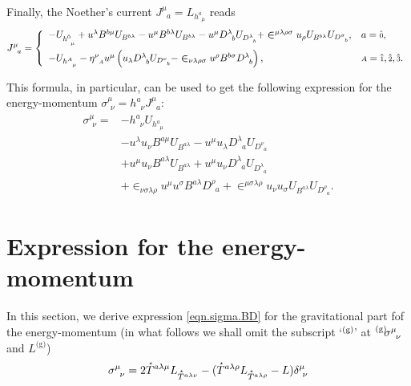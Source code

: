 \documentclass[
10pt, %
a4paper, %
oneside, %
headinclude,footinclude, %
BCOR5mm, %
]{scrartcl}
\newcommand{\sA}{\mathsmaller A}
\newcommand{\tetrsymbol}{h}
\newcommand{\itetrsymbol}{\eta}
\newcommand{\itetr}[2]{\itetrsymbol^{#1}_{\phantom{#1}#2}}
\newcommand{\tetr}[2]{\tetrsymbol^{#1}_{\phantom{#1}#2}}
\newcommand{\Dm}[2]{D_{\phantom{#2}#1}^{#2}}	%
\newcommand{\Bm}[2]{B^{#1#2}}	%
\newcommand{\Laghodge}{L}%
\newcommand{\Um}{U}%
\newcommand{\EMmat}[2]{\sigma^{#1}_{\ \,#2}}
\newcommand{\LCsymb}{\bm{\in}}    %
\newcommand{\gra}[1]{\prescript{\text{(g)}}{}{\hspace{-0.1cm}#1}}
\newcommand{\HDT}[1]{\accentset{\star}{T}^{#1}}
\newcommand{\KD}[2]{\delta^{#1}_{\ #2}}
\newcommand{\NC}[2]{J^{#2}_{\phantom{#2}#1}}
\newcommand{\indalg}[1]{\hat{\mathsmaller{#1}}}
\begin{document}
Finally, the Noether's current $ \NC{a}{\mu} = \Laghodge_{\tetr{a}{\mu}} $ reads
\begin{equation}
	\NC{a}{\mu} = \left\{
	\begin{array}{ll}
	-\Um_{\tetr{\indalg{0}}{\mu}}
	+ u^\lambda \Bm{b}{\mu} \Um_{\Bm{b}{\lambda}} 
	- u^\mu \Bm{b}{\lambda} \Um_{\Bm{b}{\lambda}} 
	- u^\mu \Dm{b}{\lambda} \Um_{\Dm{b}{\lambda}}
	+ \LCsymb^{\mu\lambda\rho\sigma} u_\rho \Um_{\Bm{b}{\lambda}}
	\Um_{\Dm{b}{\sigma}},	& a=\indalg{0},  \\[3mm] 
	-\Um_{\tetr{\sA}{\mu}}	
	- \itetr{\nu}{\sA}u^\mu
	\left(
	u_\lambda \Dm{b}{\lambda} \Um_{\Dm{b}{\nu}} 
	- \LCsymb_{\nu\lambda\rho\sigma}u^\rho\Bm{b}{\sigma}\Dm{b}{\lambda}
	\right), & \sA=\indalg{1},\indalg{2},\indalg{3}. \\ 
	\end{array} 
	\right.
\end{equation}

This formula, in particular, can be used to get the following expression for the energy-momentum $ 
\EMmat{\mu}{\nu} = \tetr{a}{\nu} \NC{a}{\mu}$:
\begin{align}
	\EMmat{\mu}{\nu} =
	& - \tetr{a}{\nu} \Um_{\tetr{a}{\mu}} \nonumber\\
	& - u^\lambda u_\nu \Bm{a}{\mu} \Um_{\Bm{a}{\lambda}} - u^\mu u_\lambda \Dm{a}{\lambda} 
	\Um_{\Dm{a}{\nu}}				\nonumber\\
	& + u^\mu u_\nu \Bm{a}{\lambda} \Um_{\Bm{a}{\lambda}} 
	+ u^\mu u_\nu \Dm{a}{\lambda} \Um_{\Dm{a}{\lambda}}
	\nonumber \\
	& + \LCsymb_{\nu\sigma\lambda\rho} u^\mu u^\sigma \Bm{a}{\lambda} \Dm{a}{\rho} 
	+ \LCsymb^{\mu\sigma\lambda\rho} u_\nu u_\sigma \Um_{\Bm{a}{\lambda}} 
	\Um_{\Dm{a}{\rho}}.\label{eqn.sigma.tetr.part}
\end{align}


\section{Expression for the energy-momentum}\label{app.energymomentum}

In this section, we derive expression \eqref{eqn.sigma.BD} for the gravitational part fof the 
energy-momentum (in what follows we shall omit the subscript `$ \gra{} $\,' at $ 
\gra{\EMmat{\mu}{\nu}} $ and $ \Laghodge^{\text{(g)}} $)
\begin{equation}\label{eqn.EM.hodge}
	\EMmat{\mu}{\nu} =
	 2 \HDT{a\lambda\mu}L_{\HDT{a\lambda\nu}} - 
	(\HDT{a\lambda\rho}L_{\HDT{a\lambda\rho}} - L) \KD{\mu}{\nu}
\end{equation}
\end{document}
